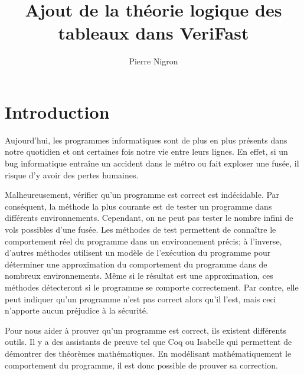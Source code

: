 \documentclass[11pt,openany]{article}
\title{Ajout de la th\'eorie logique des tableaux dans VeriFast}
\author{Pierre Nigron}
\begin{document}
\maketitle
\sloppy

\tableofcontents

\section*{Introduction}
		Aujourd'hui, les programmes informatiques sont de plus en plus pr\'esents dans notre quotidien et ont certaines fois notre vie entre leurs lignes. En effet, si un bug informatique entra\^ine un accident dans le m\'etro ou fait exploser une fus\'ee, il risque d'y avoir des pertes humaines. \par
		Malheureusement, v\'erifier qu'un programme est correct est ind\'ecidable. Par cons\'equent, la m\'ethode la plus courante est de tester un programme dans diff\'erents environnements. Cependant, on ne peut pas tester le nombre infini de vols possibles d'une fus\'ee. Les m\'ethodes de test permettent de conna\^itre le comportement r\'eel du programme dans un environnement pr\'ecis; \`a l'inverse, d'autres m\'ethodes utilisent un mod\`ele de l'ex\'ecution du programme pour d\'eterminer une approximation du comportement du programme dans de nombreux environnements. M\^eme si le r\'esultat est une approximation, ces m\'ethodes d\'etecteront si le programme se comporte correctement. Par contre, elle peut indiquer qu'un programme n'est pas correct alors qu'il l'est, mais ceci n'apporte aucun pr\'ejudice \`a la s\'ecurit\'e.
\par 

		Pour nous aider \`a prouver qu'un programme est correct, ils existent diff\'erents outils. Il y a des assistants de preuve tel que Coq ou Isabelle qui permettent de d\'emontrer des th\'eor\`emes math\'ematiques. En mod\'elisant math\'ematiquement le comportement du programme, il est donc possible de prouver sa correction. \par
		
\end{document}
